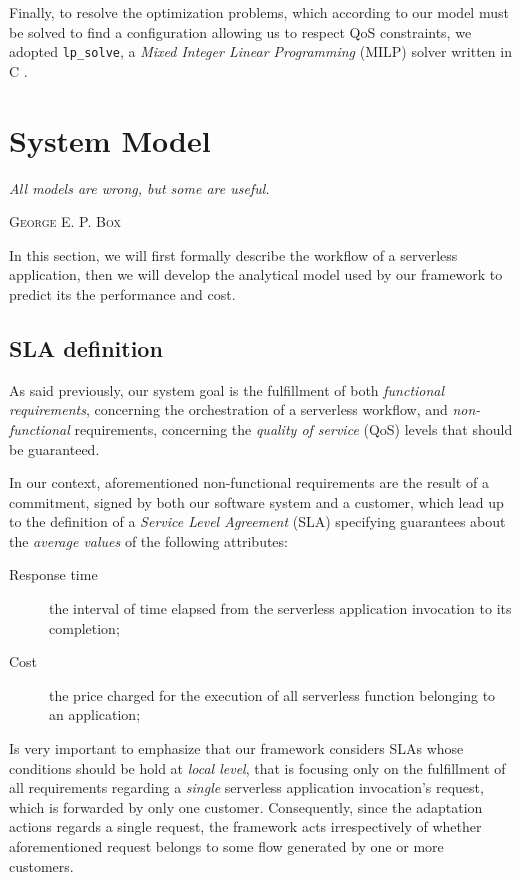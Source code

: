 \documentclass[12pt,a4paper]{report}
\begin{document}
Finally, to resolve the optimization problems, which according to our model must be solved to find a configuration allowing us to respect QoS constraints, we adopted \texttt{lp\_solve}, a \textit{Mixed Integer Linear Programming} (MILP) solver written in C \cite{lpsolve}.

\chapter{System Model}\label{chapterModel}
\epigraph{\itshape All models are wrong, but some are useful.}{\textsc{George E. P. Box}}

In this section, we will first formally describe the workflow of a serverless application, then we will develop the analytical model used by our framework to predict its the performance and cost.

\section{SLA definition}

As said previously, our system goal is the fulfillment of both \textit{functional requirements}, concerning the orchestration of a serverless workflow, and \textit{non-functional} requirements, concerning the \textit{quality of service} (QoS) levels that should be guaranteed.

In our context, aforementioned non-functional requirements are the result of a commitment, signed by both our software system and a customer, which lead  up to the definition of a \textit{Service Level Agreement} (SLA) specifying guarantees about the \textit{average values} of the following attributes:

\begin{description}
	\item[Response time] the interval of time elapsed from the
	serverless application invocation to its completion;
	\item[Cost] the price charged for the execution of all serverless function belonging to an application;
\end{description}

Is very important to emphasize that our framework considers SLAs whose conditions should be hold at \textit{local level}, that is focusing only on the fulfillment of all requirements regarding a \textit{single} serverless application invocation's request, which is forwarded by only one customer. Consequently, since the adaptation actions regards a single request, the framework acts irrespectively of whether aforementioned request belongs to some flow generated by one or more customers.
\end{document}
